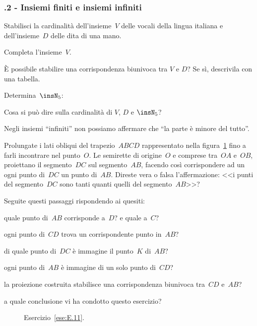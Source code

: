 \subsubsection*{\thechapter.2 - Insiemi finiti e insiemi infiniti}

\begin{esercizio}
\label{ese:E.10}
Stabilisci la cardinalità dell'insieme~$V$ delle vocali della lingua italiana e dell'insieme~$D$ delle dita di una mano.

Completa l'insieme~$V$.

\`E possibile stabilire una corrispondenza biunivoca tra $V$ e $D$? Se sì, descrivila con una tabella.

Determina~$\insN_{5}$: \dotfill

Cosa si può dire sulla cardinalità di $V$, $D$ e $\insN_5$?
\end{esercizio}

\begin{esercizio}
\label{ese:E.11}
Negli insiemi ``infiniti'' non possiamo affermare che ``la parte è minore del tutto''.

Prolungate i lati obliqui
del trapezio~${ABCD}$ rappresentato nella figura~\ref{fig:E.12} fino a farli incontrare nel punto~$O$.
Le semirette di origine~$O$ e comprese tra~${OA}$ e~${OB}$, proiettano il segmento~${DC}$ sul segmento~${AB}$,
facendo così corrispondere ad un ogni punto di~${DC}$ un punto di~${AB}$.
Direste vera o falsa l'affermazione: <<i punti del segmento~${DC}$ sono tanti quanti quelli del segmento~${AB}$>>?

Seguite questi passaggi rispondendo ai quesiti:
\begin{enumeratea}
 \item quale punto di~$AB$ corrisponde a~$D$? e quale a~$C$?
 \item ogni punto di~${CD}$ trova un corrispondente punto in~${AB}$?
 \item di quale punto di~$DC$ è immagine il punto~$K$ di~${AB}$?
 \item ogni punto di~${AB}$ è immagine di un solo punto di~${CD}$?
 \item la proiezione costruita stabilisce una corrispondenza biunivoca tra~${CD}$ e~${AB}$?
 \item a quale conclusione vi ha condotto questo esercizio?
\end{enumeratea}
\end{esercizio}
\begin{figure}[htb]
  \centering
 \caption{Esercizio~\ref{ese:E.11}.}\label{fig:E.12}
\end{figure}



